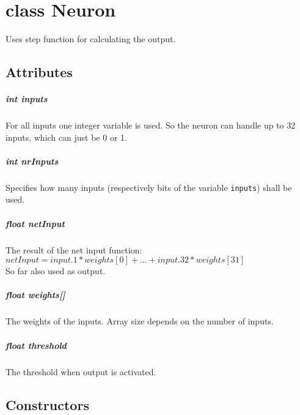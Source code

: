 \chapter{class Neuron}
Uses step function for calculating the output.

\section{Attributes}
\paragraph{int inputs}
For all inputs one integer variable is used. So the neuron can handle up to 32 inputs, which can just be 0 or 1.

\paragraph{int nrInputs}
Specifies how many inputs (respectively bits of the variable \texttt{inputs}) shall be used.

\paragraph{float netInput}
The result of the net input function:\\
$netInput = input.1*weights[0] + ... + input.32*weights[31]$\\
So far also used as output.

\paragraph{float weights[]}
The weights of the inputs. Array size depends on the number of inputs.

\paragraph{float threshold}
The threshold when output is activated.


\section{Constructors}

